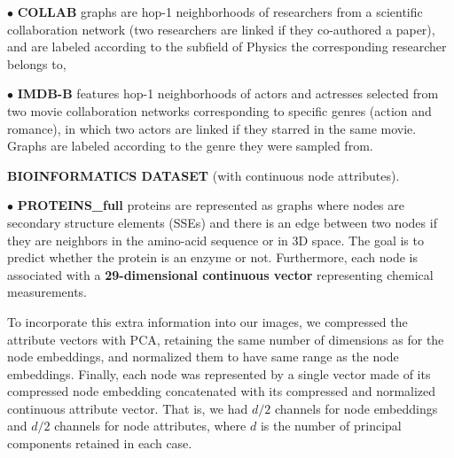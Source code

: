 \documentclass[sigconf]{acmart}
\begin{document}
\noindent$\bullet$ \textbf{COLLAB} graphs are hop-1 neighborhoods of researchers from a scientific collaboration network (two researchers are linked if they co-authored a paper), and are labeled according to the subfield of Physics the corresponding researcher belongs to,

\noindent$\bullet$ \textbf{IMDB-B} features hop-1 neighborhoods of actors and actresses selected from two movie collaboration networks corresponding to specific genres (action and romance), in which two actors are linked if they starred in the same movie. Graphs are labeled according to the genre they were sampled from.

\textbf{BIOINFORMATICS DATASET} \citep{KKMMN2016,borgwardt2005protein} (with continuous node attributes).

\noindent$\bullet$ \textbf{PROTEINS\_full} proteins are represented as graphs where nodes are secondary structure elements (SSEs) and there is
an edge between two nodes if they are neighbors in the amino-acid
sequence or in 3D space. The goal is to predict whether the protein is an enzyme or not. Furthermore, each node is associated with a \textbf{29-dimensional continuous vector} representing chemical measurements.

To incorporate this extra information into our images, we compressed the attribute vectors with PCA, retaining the same number of dimensions as for the node embeddings, and normalized them to have same range as the node embeddings. Finally, each node was represented by a single vector made of its compressed node embedding concatenated with its compressed and normalized continuous attribute vector. That is, we had $d/2$ channels for node embeddings and $d/2$ channels for node attributes, where $d$ is the number of principal components retained in each case.
\end{document}
